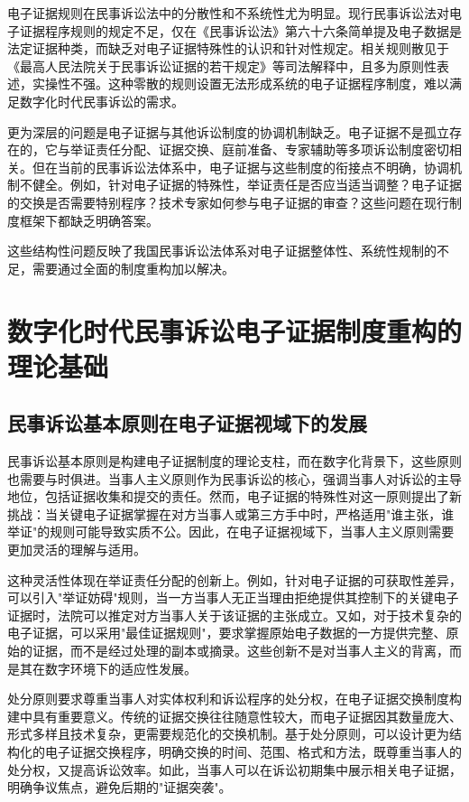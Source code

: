 电子证据规则在民事诉讼法中的分散性和不系统性尤为明显。现行民事诉讼法对电子证据程序规则的规定不足，仅在《民事诉讼法》第六十六条简单提及电子数据是法定证据种类，而缺乏对电子证据特殊性的认识和针对性规定。相关规则散见于《最高人民法院关于民事诉讼证据的若干规定》等司法解释中，且多为原则性表述，实操性不强。这种零散的规则设置无法形成系统的电子证据程序制度，难以满足数字化时代民事诉讼的需求。

更为深层的问题是电子证据与其他诉讼制度的协调机制缺乏。电子证据不是孤立存在的，它与举证责任分配、证据交换、庭前准备、专家辅助等多项诉讼制度密切相关。但在当前的民事诉讼法体系中，电子证据与这些制度的衔接点不明确，协调机制不健全。例如，针对电子证据的特殊性，举证责任是否应当适当调整？电子证据的交换是否需要特别程序？技术专家如何参与电子证据的审查？这些问题在现行制度框架下都缺乏明确答案。

这些结构性问题反映了我国民事诉讼法体系对电子证据整体性、系统性规制的不足，需要通过全面的制度重构加以解决。

\section{数字化时代民事诉讼电子证据制度重构的理论基础}

\subsection{民事诉讼基本原则在电子证据视域下的发展}

民事诉讼基本原则是构建电子证据制度的理论支柱，而在数字化背景下，这些原则也需要与时俱进。当事人主义原则作为民事诉讼的核心，强调当事人对诉讼的主导地位，包括证据收集和提交的责任。然而，电子证据的特殊性对这一原则提出了新挑战：当关键电子证据掌握在对方当事人或第三方手中时，严格适用"谁主张，谁举证"的规则可能导致实质不公。因此，在电子证据视域下，当事人主义原则需要更加灵活的理解与适用。

这种灵活性体现在举证责任分配的创新上。例如，针对电子证据的可获取性差异，可以引入"举证妨碍"规则，当一方当事人无正当理由拒绝提供其控制下的关键电子证据时，法院可以推定对方当事人关于该证据的主张成立。又如，对于技术复杂的电子证据，可以采用"最佳证据规则"，要求掌握原始电子数据的一方提供完整、原始的证据，而不是经过处理的副本或摘录。这些创新不是对当事人主义的背离，而是其在数字环境下的适应性发展。

处分原则要求尊重当事人对实体权利和诉讼程序的处分权，在电子证据交换制度构建中具有重要意义。传统的证据交换往往随意性较大，而电子证据因其数量庞大、形式多样且技术复杂，更需要规范化的交换机制。基于处分原则，可以设计更为结构化的电子证据交换程序，明确交换的时间、范围、格式和方法，既尊重当事人的处分权，又提高诉讼效率。如此，当事人可以在诉讼初期集中展示相关电子证据，明确争议焦点，避免后期的"证据突袭"。

